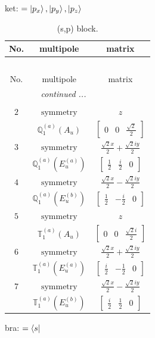 \documentclass[fleqn,8pt,landscape]{jsarticle}
\begin{document}
\noindent
ket: $=\ket{p_{x}}, \ket{p_{y}}, \ket{p_{z}}$
\renewcommand{\arraystretch}{1.6}
\begin{longtable}{ccc}
\caption{(s,p) block.}
 \\
 \hline \hline
No. & multipole & matrix \\ \hline \endfirsthead

\multicolumn{2}{l}{\tablename\ \thetable{}} \\
 \hline \hline
No. & multipole & matrix \\ \hline \endhead

 \hline \hline
\multicolumn{2}{r}{\footnotesize\it continued ...} \\ \endfoot

 \hline \hline
\multicolumn{2}{r}{} \\ \endlastfoot

$ 2 $ & $ \text{symmetry} $ & $ z $ \\
$  $ & $ \mathbb{Q}_{1}^{(a)}(A_{u}) $ & $ \begin{bmatrix} 0 & 0 & \frac{\sqrt{2}}{2} \end{bmatrix} $ \\ \hline
$ 3 $ & $ \text{symmetry} $ & $ \frac{\sqrt{2} x}{2} + \frac{\sqrt{2} i y}{2} $ \\
$  $ & $ \mathbb{Q}_{1}^{(a)}(E_{u}^{(a)}) $ & $ \begin{bmatrix} \frac{1}{2} & \frac{i}{2} & 0 \end{bmatrix} $ \\ \hline
$ 4 $ & $ \text{symmetry} $ & $ \frac{\sqrt{2} x}{2} - \frac{\sqrt{2} i y}{2} $ \\
$  $ & $ \mathbb{Q}_{1}^{(a)}(E_{u}^{(b)}) $ & $ \begin{bmatrix} \frac{1}{2} & - \frac{i}{2} & 0 \end{bmatrix} $ \\ \hline
$ 5 $ & $ \text{symmetry} $ & $ z $ \\
$  $ & $ \mathbb{T}_{1}^{(a)}(A_{u}) $ & $ \begin{bmatrix} 0 & 0 & \frac{\sqrt{2} i}{2} \end{bmatrix} $ \\ \hline
$ 6 $ & $ \text{symmetry} $ & $ \frac{\sqrt{2} x}{2} + \frac{\sqrt{2} i y}{2} $ \\
$  $ & $ \mathbb{T}_{1}^{(a)}(E_{u}^{(a)}) $ & $ \begin{bmatrix} \frac{i}{2} & - \frac{1}{2} & 0 \end{bmatrix} $ \\ \hline
$ 7 $ & $ \text{symmetry} $ & $ \frac{\sqrt{2} x}{2} - \frac{\sqrt{2} i y}{2} $ \\
$  $ & $ \mathbb{T}_{1}^{(a)}(E_{u}^{(b)}) $ & $ \begin{bmatrix} \frac{i}{2} & \frac{1}{2} & 0 \end{bmatrix} $ \\ \hline
\end{longtable}
bra: $=\bra{s}$
\end{document}
